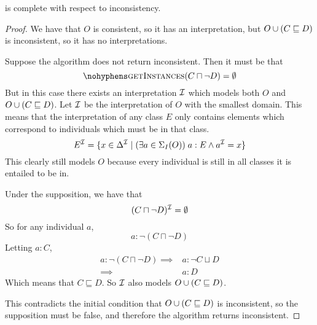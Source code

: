 \documentclass[paper.tex]{subfiles}
\begin{document}
\begin{lemma}
  \label{lem:testSubClassOfInconsistentComplete}
   is complete with respect to inconsistency.
\end{lemma}
\begin{proof}

  We have that $O$ is consistent, so it has an interpretation, but $O \cup (C \sqsubseteq D)$ is inconsistent, so it has no interpretations.

  Suppose the algorithm does not return inconsistent.  Then it must be that
  \[ \textproc{getInstances}(C \sqcap \neg D) = \emptyset \]
  But in this case there exists an interpretation $\mathcal{I}$ which models both $O$ and $O \cup (C \sqsubseteq D)$.  Let $\mathcal{I}$ be the interpretation of $O$ with the smallest domain.  This means that the interpretation of any class $E$ only contains elements which correspond to individuals which must be in that class.
  \[ E^{\mathcal{I}} = \{ x \in \Delta^{\mathcal{I}} \mid (\exists a \in \Sigma_I(O)) \; a : E \land a^{\mathcal{I}} = x \} \]
  This clearly still models $O$ because every individual is still in all classes it is entailed to be in.

  Under the supposition, we have that
  \[ (C \sqcap \neg D)^{\mathcal{I}} = \emptyset \]
  So for any individual $a$,
  \[ a : \neg (C \sqcap \neg D) \]
  Letting $a : C$,
  \begin{align*}
    a : \neg (C \sqcap \neg D)
    \implies{}& a : \neg C \sqcup D \\
    \implies{}& a : D
  \end{align*}
  Which means that $C \sqsubseteq D$.  So $\mathcal{I}$ also models $O \cup (C \sqsubseteq D)$.

  This contradicts the initial condition that $O \cup (C \sqsubseteq D)$ is inconsistent, so the supposition must be false, and therefore the algorithm returns inconsistent.
\end{proof}
\end{document}
